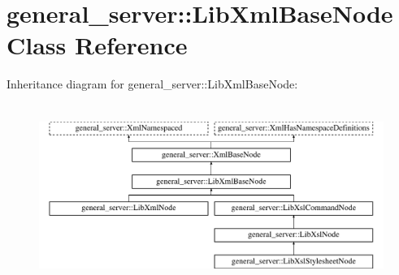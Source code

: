 \hypertarget{classgeneral__server_1_1LibXmlBaseNode}{\section{general\-\_\-server\-:\-:\-Lib\-Xml\-Base\-Node \-Class \-Reference}
\label{classgeneral__server_1_1LibXmlBaseNode}
}
\-Inheritance diagram for general\-\_\-server\-:\-:\-Lib\-Xml\-Base\-Node\-:\begin{figure}[H]
\begin{center}
\leavevmode
\includegraphics[height=5.978648cm]{classgeneral__server_1_1LibXmlBaseNode}
\end{center}
\end{figure}
